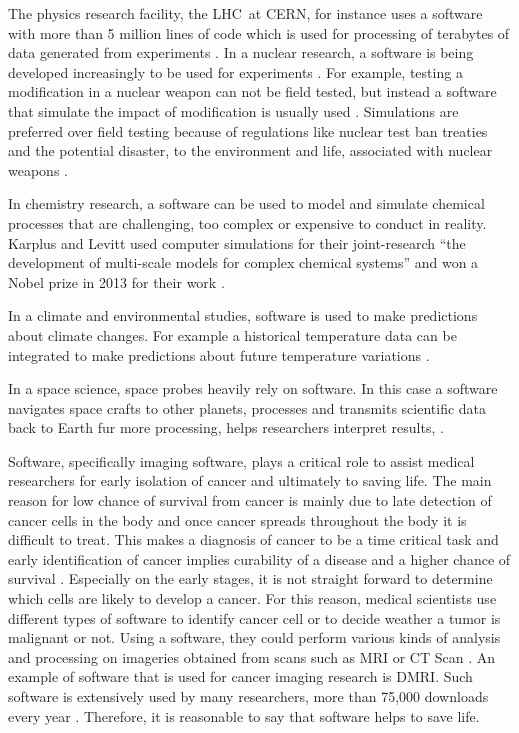 The physics research facility, the \ac{LHC}\ at \ac{CERN}, for instance uses a software with more than 5 million lines of code which is used for processing of terabytes of data generated from experiments \citep{storer2017bridging}.
In a nuclear research, a software is being developed increasingly to be used for experiments \citep{yan2017case}. For example, testing a modification in a nuclear weapon can not be field tested, but instead a software that simulate the impact of modification is usually used \citep{kanewala2014testing}. Simulations are preferred over field testing because of regulations like nuclear test ban treaties and the potential disaster, to the environment and life, associated with nuclear weapons \citep{enwiki:1053274189}. 

In chemistry research, a software can be used to model and simulate chemical processes that are challenging, too complex or expensive to conduct in reality. Karplus and Levitt used computer simulations for their joint-research “the development of multi-scale models for complex chemical systems”  and won a Nobel prize in 2013 for their work \citep{storer2017bridging, andre2014nobel}. 

In a climate and environmental studies, software is used to make predictions about climate changes. For example a historical temperature data can be integrated to make predictions about future temperature variations \citep{storer2017bridging}.

In a space science, space probes heavily rely on software. In this case a software navigates space crafts to other planets, processes and transmits scientific data back to Earth fur more processing, helps researchers interpret results, \citep{lutz2011software}. 

Software, specifically imaging software, plays a critical role to assist medical researchers for early isolation of cancer and ultimately to saving life.  The main reason for low chance of survival from cancer is mainly due to late detection of cancer cells in the body  and once cancer spreads throughout the body it is difficult to treat. This makes a diagnosis of cancer to be a time critical task and early identification of cancer implies curability of a disease and a higher chance of survival \citep{wagner2004challenges}. Especially on the early stages, it is not straight forward to determine which cells are likely to develop a cancer. For this reason, medical scientists use different types of software to identify cancer cell or to decide weather a tumor is malignant or not. Using a software, they could perform various kinds of analysis and processing on imageries obtained from scans such as \ac{MRI} or \ac{CT} Scan \citep{al2012lung}. An example of software that is used for cancer imaging research is DMRI. Such software is extensively used by many researchers, more than 75,000 downloads every year \citep{norton2017slicerdmri}. Therefore, it is reasonable to say that software helps to save life.


